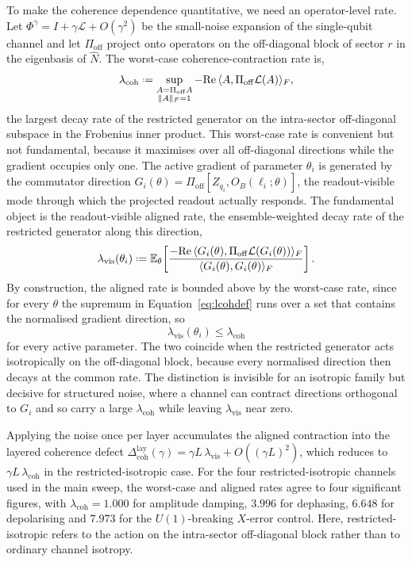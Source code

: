 \documentclass{article}
\newcommand{\lcoh}{\lambda_{\mathrm{coh}}}
\newcommand{\lvis}{\lambda_{\mathrm{vis}}}
\newcommand{\Lop}{\mathcal{L}}
\newcommand{\Pioff}{\Pi_{\mathrm{off}}}
\newcommand{\Dcohlay}{\Delta_{\mathrm{coh}}^{\mathrm{lay}}}
\newcommand{\eqdef}{\mathrel{\vcenter{\baselineskip0.5ex \lineskiplimit0pt
  \hbox{\scriptsize.}\hbox{\scriptsize.}}}=}
\begin{document}
To make the coherence dependence quantitative, we need an operator-level rate. Let $\Phi^\gamma=I+\gamma\Lop+O(\gamma^2)$ be the small-noise expansion of the single-qubit channel and let $\Pioff$ project onto operators on the off-diagonal block of sector $r$ in the eigenbasis of $\hat N$. The worst-case coherence-contraction rate is,
\begin{equation}
    \lcoh
    \eqdef
    \sup_{\substack{A=\Pioff A\\ \|A\|_F=1}}
    -\mathrm{Re}\,\langle A,\Pioff\Lop(A)\rangle_F ,
    \label{eq:lcohdef}
\end{equation}
the largest decay rate of the restricted generator on the intra-sector off-diagonal subspace in the Frobenius inner product. This worst-case rate is convenient but not fundamental, because it maximises over all off-diagonal directions while the gradient occupies only one. The active gradient of parameter $\theta_i$ is generated by the commutator direction $G_i(\theta)=\Pioff[Z_{q_i},O_B(\ell_i;\theta)]$, the readout-visible mode through which the projected readout actually responds. The fundamental object is the readout-visible aligned rate, the ensemble-weighted decay rate of the restricted generator along this direction,
\begin{equation}
    \lvis(\theta_i)
    \eqdef
    \mathbb{E}_{\theta}\!\left[
    \frac{-\mathrm{Re}\,\langle G_i(\theta),\Pioff\Lop(G_i(\theta))\rangle_F}
         {\langle G_i(\theta),G_i(\theta)\rangle_F}
    \right].
    \label{eq:lvisdef}
\end{equation}
By construction, the aligned rate is bounded above by the worst-case rate, since for every $\theta$ the supremum in Equation~\eqref{eq:lcohdef} runs over a set that contains the normalised gradient direction, so
\begin{equation}
    \lvis(\theta_i)\leq\lcoh
    \label{eq:visbound}
\end{equation}
for every active parameter. The two coincide when the restricted generator acts isotropically on the off-diagonal block, because every normalised direction then decays at the common rate. The distinction is invisible for an isotropic family but decisive for structured noise, where a channel can contract directions orthogonal to $G_i$ and so carry a large $\lcoh$ while leaving $\lvis$ near zero.

Applying the noise once per layer accumulates the aligned contraction into the layered coherence defect $\Dcohlay(\gamma)=\gamma L\,\lvis+O((\gamma L)^2)$, which reduces to $\gamma L\,\lcoh$ in the restricted-isotropic case. For the four restricted-isotropic channels used in the main sweep, the worst-case and aligned rates agree to four significant figures, with $\lcoh=1.000$ for amplitude damping, $3.996$ for dephasing, $6.648$ for depolarising and $7.973$ for the $U(1)$-breaking $X$-error control. Here, restricted-isotropic refers to the action on the intra-sector off-diagonal block rather than to ordinary channel isotropy.
\end{document}
